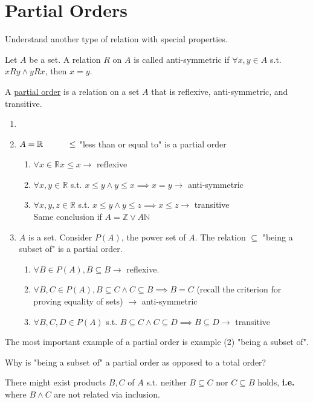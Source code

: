 \documentclass[10pt]{article}
\begin{document}
	\section{Partial Orders}
	\begin{description}
		\item[Task:] Understand another type of relation with special properties.
		\item[Definition:] Let $A$ be a set. A relation $R$ on $A$ is called anti-symmetric if $\forall x, y \in A$ s.t. $xRy \land yRx$, then $x=y$.
		\item[Definition:] A \underline{partial order} is a relation on a set $A$ that is reflexive, anti-symmetric, and transitive.
		\item[Examples:]
		\begin{enumerate}
			\item[]
			\item $A = \mathbb{R} \hspace{10mm} \leq$ "less than or equal to" is a partial order
			\begin{enumerate}
				\item $\forall x \in \mathbb{R} x \leq x \rightarrow$ reflexive
				\item $\forall x, y \in \mathbb{R}$ s.t. $x \leq y \land y \leq x \implies x=y \rightarrow$ anti-symmetric
				\item $\forall x, y, z \in \mathbb{R}$ s.t. $x \leq y \land y \leq z \implies x \leq z \rightarrow$ transitive \\
				Same conclusion if $A = \mathbb{Z} \lor A \mathbb{N}$
			\end{enumerate}
			\item $A$ is a set. Consider $P(A)$, the power set of $A$. The relation $\subseteq$ "being a subset of" is a partial order.
			\begin{enumerate}
				\item $\forall B \in P(A), B\subseteq B \rightarrow$ reflexive.
				\item $\forall B, C \in P(A), B \subseteq C \land C \subseteq B \implies B=C$ (recall the criterion for proving equality of sets) $\rightarrow$ anti-symmetric
				\item $\forall B, C, D \in P(A)$ s.t. $B \subseteq C \land C \subseteq D \implies B \subseteq D \rightarrow$ transitive
			\end{enumerate}
		\end{enumerate}
		\item The most important example of a partial order is example (2) "being a subset of".
		\item[Q:] Why is "being a subset of" a partial order as opposed to a total order?
		\item[A:] There might exist products $B, C$ of $A$ s.t. neither $B \subseteq C$ nor $C \subseteq B$ holds, \textbf{i.e.} where $B \land C$ are not related via inclusion.
	\end{description}
	
\end{document}
